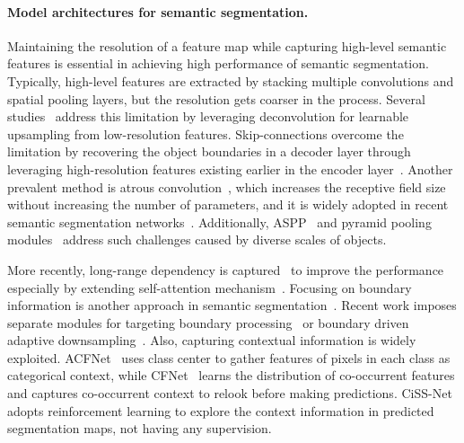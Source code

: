 \documentclass[10pt,twocolumn,letterpaper]{article}
\begin{document}
\paragraph{Model architectures for semantic segmentation.}
Maintaining the resolution of a feature map while capturing high-level semantic features is essential in achieving high performance of semantic segmentation. Typically, high-level features are extracted by stacking multiple convolutions and spatial pooling layers, but the resolution gets coarser in the process. Several studies~\cite{long2015fully,noh2015learning} address this limitation by 
leveraging deconvolution for learnable upsampling from low-resolution features. Skip-connections overcome the limitation by recovering the object boundaries in a decoder layer through leveraging high-resolution features existing earlier in the encoder layer~\cite{badrinarayanan2017segnet,ronneberger2015u,lin2017refinenet,chen2018encoder}. Another prevalent method is atrous convolution~\cite{chen2018deeplab, yu2015multi}, which increases the receptive field size without increasing the number of parameters, and it is widely adopted in recent semantic segmentation networks~\cite{chen2017rethinking, chen2018encoder, yang2018denseaspp, zhang2018context, zhu2019improving}. Additionally, ASPP~\cite{chen2017rethinking} and pyramid pooling modules~\cite{zhao2017pyramid} address such challenges caused by diverse scales of objects.

More recently, long-range dependency is captured~\cite{zhu2019asymmetric,huang2019ccnet,fu2019dual} to improve the performance especially by extending self-attention mechanism~\cite{vaswani2017attention}.
Focusing on boundary information is another approach in semantic segmentation~\cite{bertasius2015high,chen2016semantic,ding2019boundary,takikawa2019gated,marin2019efficient}. Recent work imposes separate modules for targeting boundary processing~\cite{ding2019boundary,takikawa2019gated} or boundary driven adaptive downsampling~\cite{marin2019efficient}.
Also, capturing contextual information is widely exploited. ACFNet~\cite{zhang2019acfnet} uses class center to gather features of pixels in each class as categorical context, while CFNet~\cite{zhang2019co} learns the distribution of co-occurrent features and captures co-occurrent context to relook before making predictions. CiSS-Net~\cite{zhou2019context} adopts reinforcement learning to explore the context information in predicted segmentation maps, not having any supervision.
\end{document}

